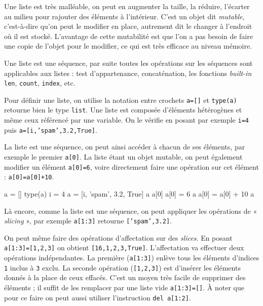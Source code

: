 Une liste est très malléable, on peut en augmenter la taille, la réduire, l'écarter au milieu pour rajouter des éléments à l'intérieur. C'est un objet dit \textit{mutable}, c'est-à-dire qu'on peut le modifier en place, autrement dit le changer à l'endroit où il est stocké. L'avantage de cette mutabilité est que l'on a pas besoin de faire une copie de l'objet pour le modifier, ce qui est très efficace au niveau mémoire.

Une liste est une séquence, par suite toutes les opérations sur les séquences sont applicables aux listes : test d'appartenance, concaténation, les fonctions \textit{built-in} \texttt{len}, \texttt{count}, \texttt{index}, etc.

Pour définir une liste, on utilise la notation entre crochets \texttt{a=[]} et \texttt{type(a)} retourne bien le type \texttt{list}. Une liste est composée d'éléments hétérogènes et même ceux référencé par une variable. On le vérifie en posant par exemple \texttt{i=4} puis \texttt{a=[i,'spam',3.2,True]}.

La liste est une séquence, on peut ainsi accéder à chacun de ses éléments, par exemple le premier \texttt{a[0]}. La liste étant un objet mutable, on peut également modifier un élément \texttt{a[0]=6}, voire directement faire une opération sur cet élément : \texttt{a[0]=a[0]+10}.

\begin{idleconsole}
\begin{pyconsole}
a = []
type(a)
i = 4
a = [i, 'spam', 3.2, True]
a
a[0]
a[0] = 6
a
a[0] = a[0] + 10
a
\end{pyconsole}
\end{idleconsole}

Là encore, comme la liste est une séquence, on peut appliquer les opérations de « \textit{slicing} », par exemple \texttt{a[1:3]} retourne \texttt{['spam',3.2]}.

On peut même faire des opérations d'affectation sur des \textit{slices}. En posant \texttt{a[1:3]=[1,2,3]} on obtient \texttt{[16,1,2,3,True]}. L'affectation va effectuer deux opérations indépendantes. La première (\texttt{a[1:3]}) enlève tous les éléments d'indices \texttt{1} inclus à \texttt{3} exclu. La seconde opération (\texttt{[1,2,3]}) est d'insérer les éléments donnés à la place de ceux effacés. C'est un moyen très facile de supprimer des éléments ; il suffit de les remplacer par une liste vide \texttt{a[1:3]=[]}. À noter que pour ce faire on peut aussi utiliser l'instruction \texttt{del a[1:2]}.

